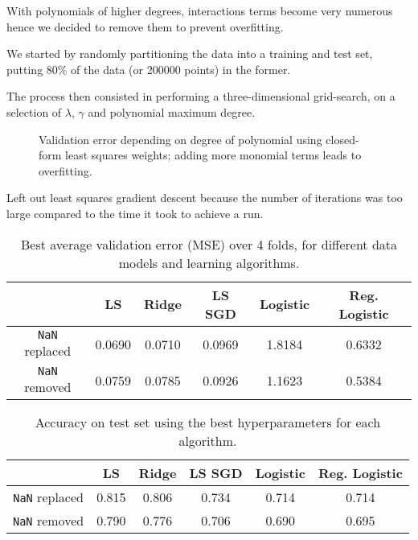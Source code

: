 \documentclass[10pt,conference,compsocconf]{IEEEtran}
\begin{document}
With polynomials of higher degrees, interactions terms become very numerous hence we decided to remove them
to prevent overfitting.


We started by randomly partitioning the data into a training and test set,
putting 80\% of the data (or 200000 points) in the former.

The process then consisted in performing a three-dimensional grid-search, on a selection of $\lambda$, $\gamma$ and polynomial maximum degree.


\begin{figure}
  \centering
  
  \vspace{-3mm}
  \caption{Validation error depending on degree of polynomial using closed-form least squares weights; adding more monomial terms leads to overfitting.}
  \label{fig:overfitting}
\end{figure}

Left out least squares gradient descent because the number of iterations was too large compared to the time it took to achieve a run.


\begin{table}
  \begin{tabular}{ |c|c|c|c|c|c| } 
    \hline
     & LS & Ridge & LS SGD & Logistic & Reg. Logistic \\
    \hline
    \texttt{NaN} replaced & 0.0690 & 0.0710 & 0.0969 & 1.8184 & 0.6332 \\
    \texttt{NaN} removed  & 0.0759 & 0.0785 & 0.0926 & 1.1623 & 0.5384 \\
    \hline
  \end{tabular}

  \caption{Best average validation error (MSE) over 4 folds, for different data models and learning algorithms.}
  \label{tbl:validation}
\end{table}


\begin{table}
  \begin{tabular}{ |c|c|c|c|c|c| } 
    \hline
     & LS & Ridge & LS SGD & Logistic & Reg. Logistic \\
    \hline
    \texttt{NaN} replaced & 0.815 & 0.806 & 0.734 & 0.714 & 0.714 \\
    \texttt{NaN} removed  & 0.790 & 0.776 & 0.706 & 0.690 & 0.695 \\
    \hline
  \end{tabular}

  \caption{Accuracy on test set using the best hyperparameters for each algorithm.}
  \label{tbl:test-accuracies}
\end{table}
\end{document}
